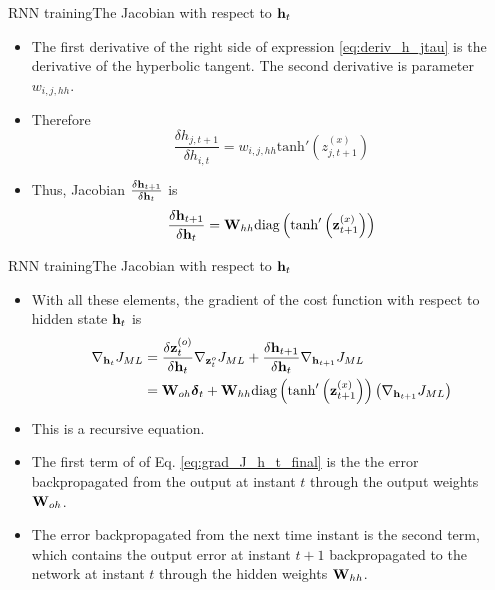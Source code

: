 \documentclass{beamer}
\begin{document}
\begin{frame}{RNN training}{The Jacobian with respect to ${\bf h}_t$}
\begin{itemize}

\item The first derivative of the right side of expression \eqref{eq:deriv_h_jtau} is the derivative of the hyperbolic tangent. The second derivative is parameter $w_{i,j,hh}$. 
\item Therefore
\begin{equation}\label{eq:deriv_h_jtau_result}
    \frac{\delta h_{j,t+1}}{\delta h_{i,t}} = w_{i,j,hh}\text{tanh}'\left(z^{(x)}_{j,t+1 }\right)
\end{equation}
\item Thus, Jacobian $\frac{\delta{\bf h}_{t+1}}{\delta{\bf h}_{t}}$ is 
\begin{equation}\label{eq:jacobian_h}
  \frac{\delta{\bf h}_{t+1}}{\delta{\bf h}_{t}} = {\bf W}_{hh} \text{diag}\left(\text{tanh}'\left({\bf z}^{(x)}_{t+1 }\right)\right) 
\end{equation}
\end{itemize}
\end{frame}
\begin{frame}{RNN training}{The Jacobian with respect to ${\bf h}_t$}
\begin{itemize}
    \item  With all these elements, the gradient of the cost function with respect to hidden state ${\bf h}_t$ is 
\begin{equation}\label{eq:grad_J_h_t_final}
\begin{split}
    \nabla_{{\bf h}_t}J_{ML} &=  \frac{\delta {\bf z}^{(o)}_{t}}{\delta {\bf h}_t}  \nabla_{{\bf z}^{o}_t}J_{ML} + \frac{\delta {\bf h}_{t+1}}{\delta {\bf h}_t} \nabla_{{\bf h}_{t+1}}J_{ML}\\
    &={\bf W}_{oh}{\boldsymbol \delta}_{t} + {\bf W}_{hh}  \text{diag}\left(\text{tanh}'\left({\bf z}^{(x)}_{t+1}\right)\right)\left(\nabla_{{\bf h}_{t+1}}J_{ML} \right)
\end{split}
\end{equation}
\item This is a recursive equation.
\item The first term of of Eq. \ref{eq:grad_J_h_t_final}  is the the error backpropagated from the output at instant $t$ through the output weights ${\bf W}_{oh}$. 
\item The error backpropagated from the next time instant is the second term, which contains the output error at instant $t+1$ backpropagated to the network at instant $t$ through the hidden weights ${\bf W}_{hh}$. 
\end{itemize}
 
\end{frame}
\end{document}
